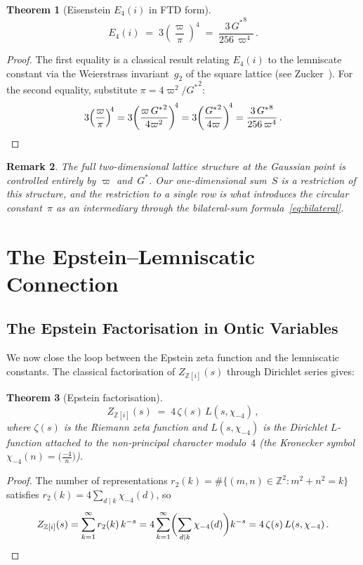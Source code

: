 \documentclass[12pt]{article}
\newtheorem{theorem}{Theorem}[section]
\newtheorem{remark}[theorem]{Remark}
\newcommand{\Z}{\mathbb{Z}}
\begin{document}
\begin{theorem}[Eisenstein $E_4(i)$ in FTD form]\label{thm:E4}
\begin{equation}\label{eq:E4}
E_4(i)\;=\;3\!\left(\frac{\varpi}{\pi}\right)^{\!4}
\;=\;\frac{3\,{G^{*}}^8}{256\,\varpi^4}\,.
\end{equation}
\end{theorem}
\begin{proof}
The first equality is a classical result relating $E_4(i)$ to the
lemniscate constant via the Weierstrass invariant~$g_2$ of the square
lattice (see Zucker~\cite{zucker77}).  For the second equality, substitute
$\pi=4\varpi^2/{G^{*}}^2$:
\[
3\!\left(\frac{\varpi}{\pi}\right)^{\!4}
= 3\!\left(\frac{\varpi\,{G^{*}}^2}{4\varpi^2}\right)^{\!4}
= 3\!\left(\frac{{G^{*}}^2}{4\varpi}\right)^{\!4}
= \frac{3\,{G^{*}}^8}{256\,\varpi^4}\,.\qedhere
\]
\end{proof}

\begin{remark}\label{rem:2d-ontic}
The full two-dimensional lattice structure at the Gaussian point is
controlled entirely by $\varpi$ and~${G^{*}}$.  Our one-dimensional sum~$S$
is a restriction of this structure, and the restriction to a single row is
what introduces the circular constant~$\pi$ as an intermediary through the
bilateral-sum formula~\eqref{eq:bilateral}.
\end{remark}

\section{The Epstein--Lemniscatic Connection}\label{sec:epstein}

\subsection{The Epstein Factorisation in Ontic Variables}\label{sec:epstein-ontic}

We now close the loop between the Epstein zeta function and the lemniscatic
constants.  The classical factorisation of $Z_{\Z[i]}(s)$ through
Dirichlet series gives:

\begin{theorem}[Epstein factorisation]\label{thm:epstein-factor}
\begin{equation}\label{eq:epstein-factor}
Z_{\Z[i]}(s) \;=\; 4\,\zeta(s)\,L(s,\chi_{-4})\,,
\end{equation}
where $\zeta(s)$ is the Riemann zeta function and $L(s,\chi_{-4})$ is the
Dirichlet $L$-function attached to the non-principal character modulo~$4$
(the Kronecker symbol $\chi_{-4}(n)=\bigl(\frac{-4}{n}\bigr)$).
\end{theorem}
\begin{proof}
The number of representations $r_2(k)=\#\{(m,n)\in\Z^2:m^2+n^2=k\}$
satisfies $r_2(k)=4\sum_{d\mid k}\chi_{-4}(d)$, so
\[
Z_{\Z[i]}(s)=\sum_{k=1}^{\infty}r_2(k)\,k^{-s}
=4\sum_{k=1}^{\infty}\biggl(\sum_{d\mid k}\chi_{-4}(d)\biggr)k^{-s}
=4\,\zeta(s)\,L(s,\chi_{-4})\,.\qedhere
\]
\end{proof}
\end{document}
